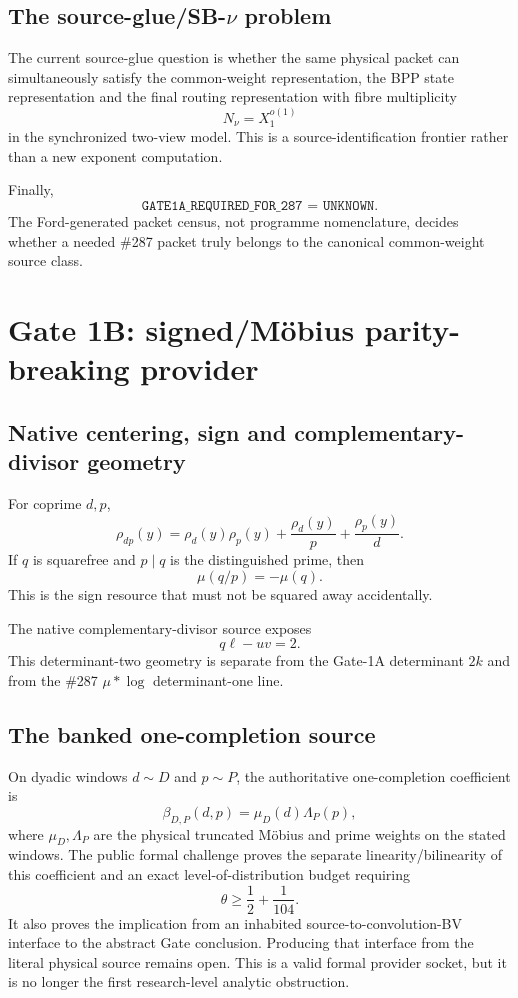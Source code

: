 \documentclass[11pt]{article}
\theoremstyle{definition}
\newcommand{\1}{\mathbf 1}
\begin{document}
\subsection{The source-glue/SB-$\nu$ problem}

The current source-glue question is whether the same physical packet can simultaneously
satisfy the common-weight representation, the BPP state representation and the final
routing representation with fibre multiplicity
\[
\boxed{N_\nu=X_1^{o(1)}}
\tag{G1A-SBnu}
\]
in the synchronized two-view model.  This is a source-identification frontier rather than
a new exponent computation.

Finally,
\[
\boxed{\texttt{GATE1A\_REQUIRED\_FOR\_287 = UNKNOWN}.}
\]
The Ford-generated packet census, not programme nomenclature, decides whether a needed
\#287 packet truly belongs to the canonical common-weight source class.

\section{Gate 1B: signed/M\"obius parity-breaking provider}
\label{sec:gate1b-theory}

\subsection{Native centering, sign and complementary-divisor geometry}

For coprime $d,p$,
\[
\boxed{
\rho_{dp}(y)
=
\rho_d(y)\rho_p(y)
+\frac{\rho_d(y)}p
+\frac{\rho_p(y)}d.
}
\tag{G1B-center}
\]
If $q$ is squarefree and $p\mid q$ is the distinguished prime, then
\[
\boxed{\mu(q/p)=-\mu(q).}
\tag{G1B-sign}
\]
This is the sign resource that must not be squared away accidentally.

The native complementary-divisor source exposes
\[
\boxed{q\ell-uv=2.}
\tag{G1B-det}
\]
This determinant-two geometry is separate from the Gate-1A determinant $2k$ and from the
\#287 $\mu*\log$ determinant-one line.

\subsection{The banked one-completion source}

On dyadic windows $d\sim D$ and $p\sim P$, the authoritative one-completion coefficient is
\[
\boxed{
\beta_{D,P}(d,p)=\mu_D(d)\Lambda_P(p),
}
\tag{G1B-beta}
\]
where $\mu_D,\Lambda_P$ are the physical truncated M\"obius and prime weights on the stated
windows.  The public formal challenge proves the separate linearity/bilinearity of this
coefficient and an exact level-of-distribution budget requiring
\[
\boxed{
\theta\ge\frac12+\frac1{104}.
}
\tag{G1B-104}
\]
It also proves the implication from an inhabited source-to-convolution-BV interface to the
abstract Gate conclusion.  Producing that interface from the literal physical source remains
open.  This is a valid formal provider socket, but it is no longer the first research-level
analytic obstruction.
\end{document}
